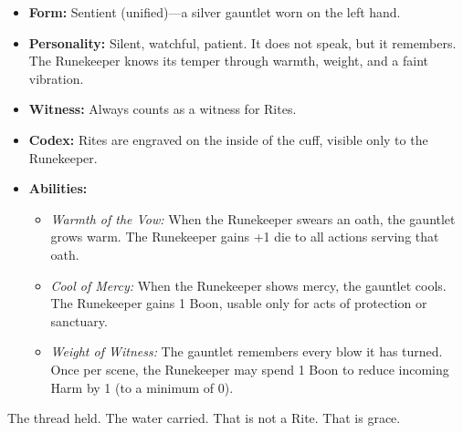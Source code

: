 \begin{itemize}
\item \textbf{Form:} Sentient (unified)—a silver gauntlet worn on the left hand.
\item \textbf{Personality:} Silent, watchful, patient. It does not speak, but it remembers. The Runekeeper knows its temper through warmth, weight, and a faint vibration.
\item \textbf{Witness:} Always counts as a witness for Rites.
\item \textbf{Codex:} Rites are engraved on the inside of the cuff, visible only to the Runekeeper.
\item \textbf{Abilities:}
\begin{itemize}
\item \textit{Warmth of the Vow:} When the Runekeeper swears an oath, the gauntlet grows warm. The Runekeeper gains +1 die to all actions serving that oath.
\item \textit{Cool of Mercy:} When the Runekeeper shows mercy, the gauntlet cools. The Runekeeper gains 1 Boon, usable only for acts of protection or sanctuary.
\item \textit{Weight of Witness:} The gauntlet remembers every blow it has turned. Once per scene, the Runekeeper may spend 1 Boon to reduce incoming Harm by 1 (to a minimum of 0).
\end{itemize}
\end{itemize}

The thread held. The water carried. That is not a Rite. That is grace.
